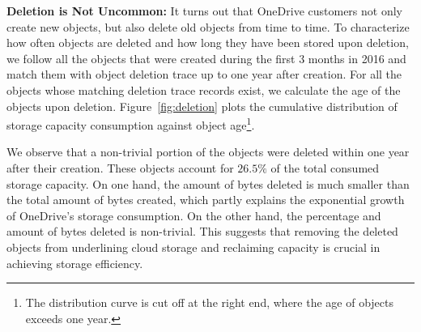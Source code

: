 {\bf Deletion is Not Uncommon:} It turns out that OneDrive customers not only
create new objects, but also delete old objects from time to time. To
characterize how often objects are deleted and how long they have been stored
upon deletion, we follow all the objects that were created during the first 3
months in 2016 and match them with object deletion trace up to one year after
creation. For all the objects whose matching deletion trace records exist, we
calculate the age of the objects upon deletion. Figure~\ref{fig:deletion} plots
the cumulative distribution of storage capacity consumption against object
age\footnote{The distribution curve is cut off at the right end, where the age of
objects exceeds one year.}.

We observe that a non-trivial portion of the objects were deleted within one
year after their creation. These objects account for $26.5\%$ of the total
consumed storage capacity. On one hand, the amount of bytes deleted is much
smaller than the total amount of bytes created, which partly explains the
exponential growth of OneDrive's storage consumption. On the other
hand, the percentage and amount of bytes deleted is non-trivial. This suggests
that removing the deleted objects from underlining cloud storage and reclaiming
capacity is crucial in achieving storage efficiency.


%
%

